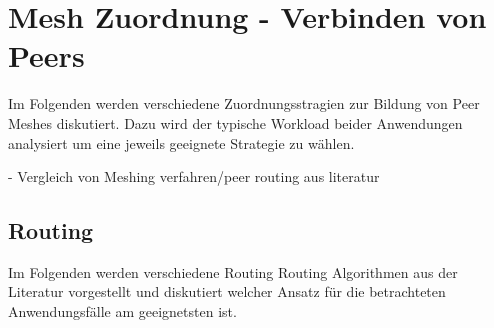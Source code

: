 %
%
%
%

\section{Mesh Zuordnung - Verbinden von Peers}
Im Folgenden werden verschiedene Zuordnungsstragien zur Bildung von Peer Meshes diskutiert. Dazu wird der typische Workload beider Anwendungen analysiert um eine jeweils geeignete Strategie zu wählen. 

- Vergleich von Meshing verfahren/peer routing aus literatur
\subsection{Routing}
Im Folgenden werden verschiedene Routing \pTp Routing Algorithmen aus der Literatur vorgestellt und diskutiert welcher Ansatz für die betrachteten Anwendungsfälle am geeignetsten ist.

